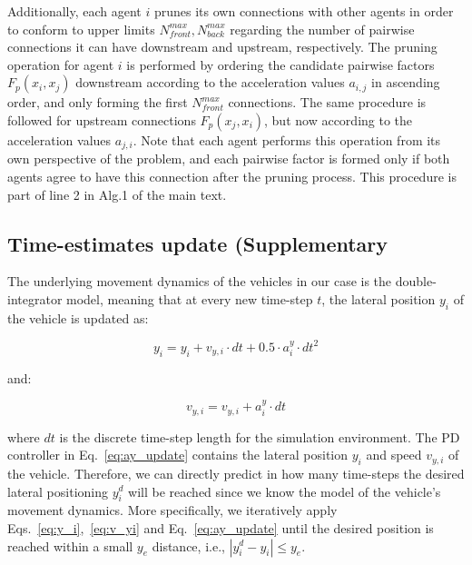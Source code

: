 Additionally, each agent $i$ prunes its own connections with other agents in order to conform to upper limits $N_{front}^{max}, N_{back}^{max}$ regarding the number of pairwise connections it can have downstream and upstream, respectively. 
The pruning operation for agent $i$ is performed by ordering the candidate pairwise factors $F_{p}(x_i,x_j)$ downstream according to the acceleration values $a_{i, j}$ in ascending order, and only forming the first $N_{front}^{max}$ connections.
The same procedure is followed for upstream connections $F_{p}(x_j,x_i)$, but now according to the acceleration values $a_{j,i}$.
Note that each agent performs this operation from its own perspective of the problem, and each pairwise factor is formed only if both agents agree to have this connection after the pruning process. 
This procedure is part of line 2 in Alg.1 of the main text. 



\subsection{Time-estimates update (Supplementary}\label{sec:async_max_sum_lf2}


The underlying movement dynamics of the vehicles in our case is the double-integrator model, meaning that at every new time-step $t$, the lateral position $y_i$ of the vehicle is updated as:

\begin{equation}\label{eq:y_i}
    y_i = y_i + v_{y,i}\cdot dt + 0.5\cdot a^y_i \cdot dt^2
\end{equation}

\noindent and:


\begin{equation}\label{eq:v_yi}
    v_{y,i} = v_{y,i} + a^y_i\cdot dt
\end{equation}

\noindent where $dt$ is the discrete time-step length for the simulation environment.
The PD controller in Eq.~\ref{eq:ay_update} contains the lateral position $y_i$ and speed $v_{y,i}$ of the vehicle. 
Therefore, we can directly predict in how many time-steps the desired lateral positioning $y_i^d$ will be reached since we know the model of the vehicle's movement dynamics.
More specifically, we iteratively apply Eqs.~\ref{eq:y_i},~\ref{eq:v_yi} and Eq.~\ref{eq:ay_update} until the desired position is reached within a small $y_e$ distance, i.e., $|y_i^d - y_i | \leq y_{e}$.






